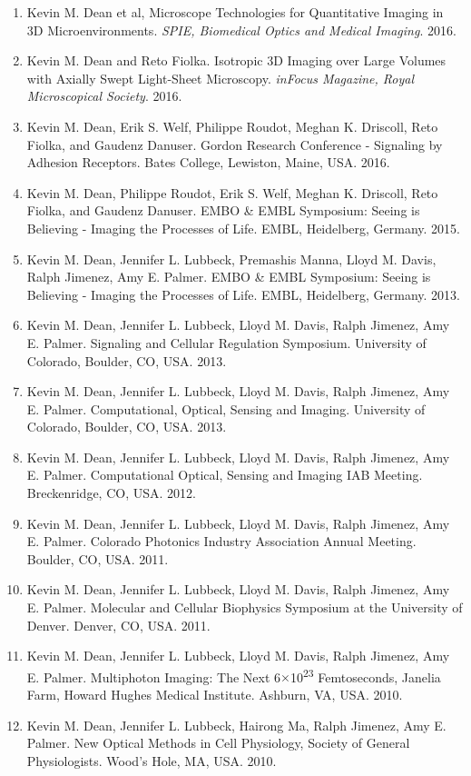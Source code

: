 \begin{enumerate}
\item Kevin M. Dean et al,  Microscope Technologies for Quantitative Imaging in 3D Microenvironments.  {\it SPIE, Biomedical Optics and Medical Imaging}.  2016.
\item Kevin M. Dean and Reto Fiolka. Isotropic 3D Imaging over Large Volumes with Axially Swept Light-Sheet Microscopy.  {\it inFocus Magazine, Royal Microscopical Society}.  2016.
\item Kevin M. Dean, Erik S. Welf, Philippe Roudot, Meghan K. Driscoll, Reto Fiolka, and Gaudenz Danuser.  Gordon Research Conference - Signaling by Adhesion Receptors.  Bates College, Lewiston, Maine, USA. 2016.
\item Kevin M. Dean, Philippe Roudot, Erik S. Welf, Meghan K. Driscoll, Reto Fiolka, and Gaudenz Danuser.  EMBO \& EMBL Symposium: Seeing is Believing - Imaging the Processes of Life.  EMBL, Heidelberg, Germany.  2015.
\item Kevin M. Dean, Jennifer L. Lubbeck, Premashis Manna, Lloyd M. Davis, Ralph Jimenez, Amy E. Palmer.  EMBO \& EMBL Symposium: Seeing is Believing - Imaging the Processes of Life.  EMBL, Heidelberg, Germany. 2013.
\item Kevin M. Dean, Jennifer L. Lubbeck, Lloyd M. Davis, Ralph Jimenez, Amy E. Palmer.  Signaling and Cellular Regulation Symposium.  University of Colorado, Boulder, CO, USA.  2013.
\item Kevin M. Dean, Jennifer L. Lubbeck, Lloyd M. Davis, Ralph Jimenez, Amy E. Palmer.  Computational, Optical, Sensing and Imaging.  University of Colorado, Boulder, CO, USA.  2013.
\item Kevin M. Dean, Jennifer L. Lubbeck, Lloyd M. Davis, Ralph Jimenez, Amy E. Palmer.  Computational Optical, Sensing and Imaging IAB Meeting.  Breckenridge, CO, USA.  2012.
\item Kevin M. Dean, Jennifer L. Lubbeck, Lloyd M. Davis, Ralph Jimenez, Amy E. Palmer.  Colorado Photonics Industry Association Annual Meeting.  Boulder, CO, USA. 2011.
\item Kevin M. Dean, Jennifer L. Lubbeck, Lloyd M. Davis, Ralph Jimenez, Amy E. Palmer.  Molecular and Cellular Biophysics Symposium at the University of Denver.  Denver, CO, USA. 2011.
\item Kevin M. Dean, Jennifer L. Lubbeck, Lloyd M. Davis, Ralph Jimenez, Amy E. Palmer.  Multiphoton Imaging: The Next 6$\times$10\textsuperscript{23} Femtoseconds, Janelia Farm, Howard Hughes Medical Institute.  Ashburn, VA, USA. 2010.
\item Kevin M. Dean, Jennifer L. Lubbeck, Hairong Ma, Ralph Jimenez, Amy E. Palmer.  New Optical Methods in Cell Physiology, Society of General Physiologists. Wood's Hole, MA, USA. 2010.

\end{enumerate}
